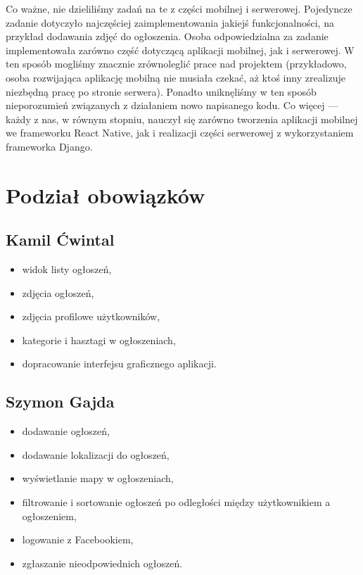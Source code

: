 \documentclass[licencjacka]{pracamgr}
\begin{document}
Co ważne, nie dzieliliśmy zadań na te z części mobilnej i serwerowej. Pojedyncze zadanie dotyczyło najczęściej zaimplementowania jakiejś funkcjonalności, na przykład dodawania zdjęć do ogłoszenia. Osoba odpowiedzialna za zadanie implementowała zarówno część dotyczącą aplikacji mobilnej, jak i serwerowej. W ten sposób mogliśmy znacznie zrównoleglić prace nad projektem (przykładowo, osoba rozwijająca aplikację mobilną nie musiała czekać, aż ktoś inny zrealizuje niezbędną pracę po stronie serwera). Ponadto uniknęliśmy w ten sposób nieporozumień związanych z działaniem nowo napisanego kodu. Co więcej --- każdy z nas, w równym stopniu, nauczył się zarówno tworzenia aplikacji mobilnej we frameworku React Native, jak i realizacji części serwerowej z wykorzystaniem frameworka Django.

\section{Podział obowiązków}

\subsection{Kamil Ćwintal}
\begin{itemize}
\setlength\itemsep{-0.2em}
    \item widok listy ogłoszeń,
    \item zdjęcia ogłoszeń,
    \item zdjęcia profilowe użytkowników,
    \item kategorie i hasztagi w ogłoszeniach,
    \item dopracowanie interfejsu graficznego aplikacji.
\end{itemize}{}

\subsection{Szymon Gajda}
\begin{itemize}
\setlength\itemsep{-0.2em}
    \item dodawanie ogłoszeń,
    \item dodawanie lokalizacji do ogłoszeń,
    \item wyświetlanie mapy w ogłoszeniach,
    \item filtrowanie i sortowanie ogłoszeń po odległości między użytkownikiem a ogłoszeniem,
    \item logowanie z Facebookiem,
    \item zgłaszanie nieodpowiednich ogłoszeń.
\end{itemize}{}
\end{document}
